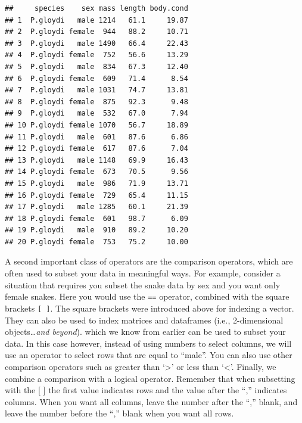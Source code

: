 \documentclass[
]{book}
\newenvironment{Shaded}{\begin{snugshade}}{\end{snugshade}}
\newcommand{\CommentTok}[1]{\textcolor[rgb]{0.56,0.35,0.01}{\textit{#1}}}
\newcommand{\DecValTok}[1]{\textcolor[rgb]{0.00,0.00,0.81}{#1}}
\newcommand{\NormalTok}[1]{#1}
\newcommand{\OtherTok}[1]{\textcolor[rgb]{0.56,0.35,0.01}{#1}}
\newcommand{\SpecialCharTok}[1]{\textcolor[rgb]{0.81,0.36,0.00}{\textbf{#1}}}
\begin{document}
\begin{Shaded}
\end{Shaded}

\begin{verbatim}
##     species    sex mass length body.cond
## 1  P.gloydi   male 1214   61.1     19.87
## 2  P.gloydi female  944   88.2     10.71
## 3  P.gloydi   male 1490   66.4     22.43
## 4  P.gloydi female  752   56.6     13.29
## 5  P.gloydi   male  834   67.3     12.40
## 6  P.gloydi female  609   71.4      8.54
## 7  P.gloydi   male 1031   74.7     13.81
## 8  P.gloydi female  875   92.3      9.48
## 9  P.gloydi   male  532   67.0      7.94
## 10 P.gloydi female 1070   56.7     18.89
## 11 P.gloydi   male  601   87.6      6.86
## 12 P.gloydi female  617   87.6      7.04
## 13 P.gloydi   male 1148   69.9     16.43
## 14 P.gloydi female  673   70.5      9.56
## 15 P.gloydi   male  986   71.9     13.71
## 16 P.gloydi female  729   65.4     11.15
## 17 P.gloydi   male 1285   60.1     21.39
## 18 P.gloydi female  601   98.7      6.09
## 19 P.gloydi   male  910   89.2     10.20
## 20 P.gloydi female  753   75.2     10.00
\end{verbatim}

A second important class of operators are the comparison operators, which are often used to subset your data in meaningful ways. For example, consider a situation that requires you subset the snake data by sex and you want only female snakes. Here you would use the \texttt{==} operator, combined with the square brackets \texttt{{[}\ {]}}. The square brackets were introduced above for indexing a vector. They can also be used to index matrices and dataframes (i.e., 2-dimensional objects\ldots{}\emph{and beyond}). which we know from earlier can be used to subset your data. In this case however, instead of using numbers to select columns, we will use an operator to select rows that are equal to ``male''. You can also use other comparison operators such as greater than `\textgreater{}' or less than `\textless{}'. Finally, we combine a comparison with a logical operator. Remember that when subsetting with the {[} {]} the first value indicates rows and the value after the ``,'' indicates columns. When you want all columns, leave the number after the ``,'' blank, and leave the number before the ``,'' blank when you want all rows.
\end{document}
